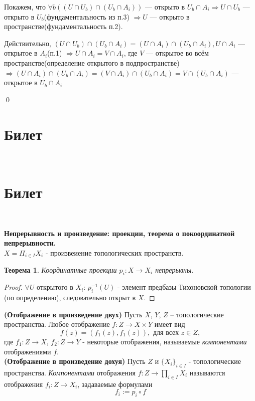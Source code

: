 \documentclass[a4paper,100pt]{article}
\theoremstyle{indented}
\newtheorem{theorem}{Теорема}
\begin{document}
            Покажем, что $\forall b \left((U \cap U_b) \cap (U_b \cap A_i)\right)$ --- открыто в $U_b \cap A_i \Rightarrow U \cap U_b$ --- открыто в $U_b$(фундаментальность из п.3) $\Rightarrow U$ --- открыто в пространстве(фундаментальность п.2).
            
            Действительно, $(U \cap U_b) \cap (U_b \cap A_i) = (U \cap A_i) \cap (U_b \cap A_i), U \cap A_i$ --- открытое в $A_i$(п.1) $\Rightarrow U \cap A_i = V \cap A_i$, где $V$ --- открытое во всём пространстве(определение открытого в подпространстве) $\Rightarrow(U \cap A_i) \cap (U_b \cap A_i) = (V \cap A_i) \cap (U_b \cap A_i) = V \cap (U_b \cap A_i)$ --- открытое в $U_b \cap A_i$
    
    \qed

\section{Билет} \

\section{Билет} \

\medskip

\textbf{Непрерывность и произведение: проекции, теорема о покоординатной непрерывности.}\\

$X = \Pi_{i\in I}X_i$ - произвеиение топологических пространств.\\

\begin{theorem}
    Координатные проекции $p_i: X\rightarrow X_i$ непрерывны.
\end{theorem}

\begin{proof}
    $\forall U$ открытого в $X_i$: $p_i^{-1}(U)$ - элемент предбазы Тихоновской топологии (по определению), следовательно открыт в $X$.
\end{proof}

\textbf{(Отображение в произведение двух)} Пусть $X$, $Y$, $Z$ – топологические пространства. Любое отображение $f: Z \to X \times Y$ имеет вид
    \[
        f(z) = (f_1(z), f_1(z)), \text{ для всех $z \in Z$},
    \]
где $f_1: Z \to X$, $f_2: Z \to Y$ - некоторые отображения, называемые \textit{компонентами} отображениями $f$. \\ 

\textbf{(Отображение в произведение дохуя)} Пусть $Z$ и $\{X_i\}_{i \in I}$ -  топологические пространства. \textit{Компонентами} отображения $f: Z \to \prod_{i \in I} X_i$ называются отображения $f_i: Z \to X_i$, задаваемые формулами
     \[
        f_i := p_i \circ f
    \]
\end{document}
